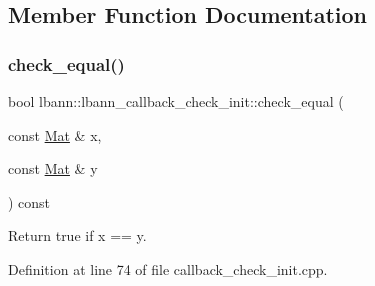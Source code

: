 \subsection{Member Function Documentation}
\mbox{\label{classlbann_1_1lbann__callback__check__init_a9a7a7cffe24967aae2b82d1668c2b87c}} 
\subsubsection{\texorpdfstring{check\+\_\+equal()}{check\_equal()}}
{\footnotesize\ttfamily bool lbann\+::lbann\+\_\+callback\+\_\+check\+\_\+init\+::check\+\_\+equal (\begin{DoxyParamCaption}\item[{const \hyperlink{base_8hpp_a68f11fdc31b62516cb310831bbe54d73}{Mat} \&}]{x,  }\item[{const \hyperlink{base_8hpp_a68f11fdc31b62516cb310831bbe54d73}{Mat} \&}]{y }\end{DoxyParamCaption}) const\hspace{0.3cm}{\ttfamily [private]}}

Return true if x == y. 

Definition at line 74 of file callback\+\_\+check\+\_\+init.\+cpp.


